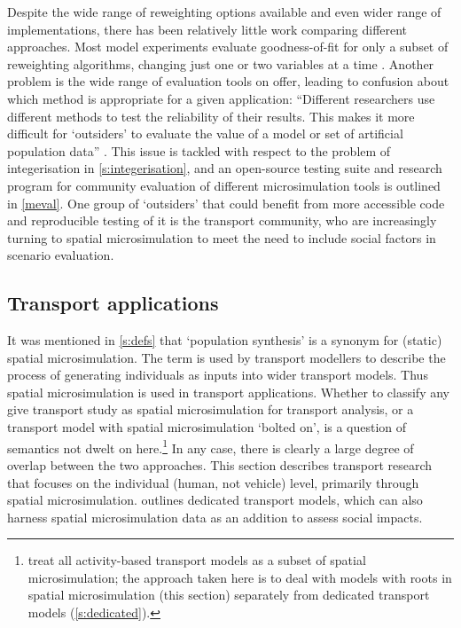 Despite the wide range of reweighting options available and even wider
range of implementations, there has been relatively little work comparing
different approaches. Most model experiments evaluate goodness-of-fit for
only a subset of reweighting algorithms, changing just one or two variables
at a time \citep{Voas2000, Smith2009, Rahman2010}. Another problem is the
wide range of evaluation tools on offer, leading to confusion about
which method is appropriate for a given application:
``Different researchers use different methods to test the
reliability of their results. This makes it more difficult for `outsiders'
to evaluate the value of a model or set of artificial population data''
\citep[p.282]{Hermes2012a}. This issue is tackled with respect
to the problem of integerisation in \cref{s:integerisation}, and
an open-source testing suite and research program
for community evaluation of different
microsimulation tools is outlined in \cref{meval}. One group
of `outsiders' that could benefit from more accessible code and
reproducible testing of it is the transport community, who are increasingly
turning to spatial microsimulation to meet the need to include
social factors in scenario evaluation.

\subsection{Transport applications}
It was mentioned in \cref{s:defs} that `population synthesis' is a synonym for
(static) spatial microsimulation. The term is used by transport modellers
to describe the
process of generating individuals as inputs into wider transport models.
Thus spatial microsimulation is used in transport applications.
Whether to classify any give transport study as spatial microsimulation for
transport analysis, or a transport model with spatial microsimulation
`bolted on', is a question of semantics not dwelt on
here.\footnote{\citet{Ballas2013-4policy-analysis}
treat all activity-based
transport models as a subset of spatial microsimulation;
the approach taken here is to deal with models with roots in
spatial microsimulation (this section) separately from
dedicated transport models (\cref{s:dedicated}).}
In any case, there is clearly a
large degree of overlap between
the two approaches. This section describes transport research that focuses on the
individual (human, not vehicle) level, primarily through spatial microsimulation.
 outlines dedicated transport models, which can also harness
spatial microsimulation data as an addition to assess social impacts.

